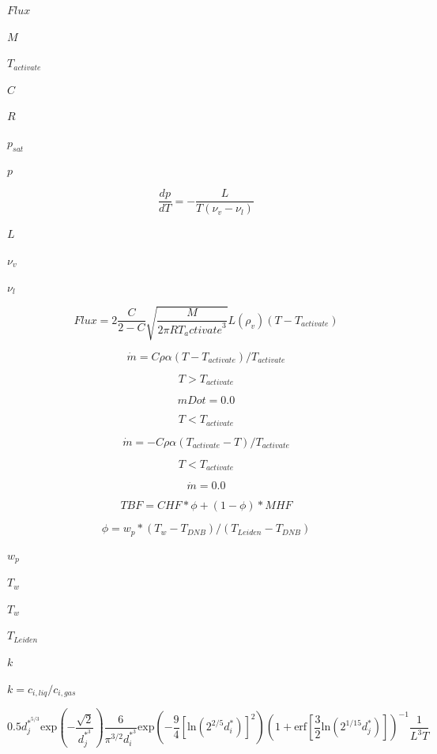 \documentclass{article}
\begin{document}
$            Flux    $
\pagebreak

$            M       $
\pagebreak

$            T_{activate} $
\pagebreak

$            C       $
\pagebreak

$            R       $
\pagebreak

$            p_{sat} $
\pagebreak

$            p       $
\pagebreak

\[
        \frac{dp}{dT} = - \frac{L}{T (\nu_v - \nu_l)}
    \]
\pagebreak

$            L       $
\pagebreak

$            \nu_v   $
\pagebreak

$            \nu_l   $
\pagebreak

\[
        Flux =
           2 \frac{C}{2 - C}
           \sqrt{\frac{M}{2 \pi R {T_activate}^3}} L (\rho_{v})
           (T - T_{activate})
    \]
\pagebreak

\[
    \dot{m} = C \rho \alpha (T - T_{activate})/T_{activate}
\]
\pagebreak

\[ T > T_{activate} \]
\pagebreak

\[ mDot = 0.0 \]
\pagebreak

\[  T < T_{activate} \]
\pagebreak

\[
    \dot{m} = -C \rho \alpha (T_{activate} - T)/T_{activate}
\]
\pagebreak

\[ T < T_{activate} \]
\pagebreak

\[ \dot{m} = 0.0 \]
\pagebreak

\[
    TBF = CHF*\phi + (1 - \phi)*MHF
\]
\pagebreak

\[
    \phi = w_p*(T_w - T_{DNB})/(T_{Leiden} - T_{DNB})
\]
\pagebreak

$        w_p $
\pagebreak

$        T_w $
\pagebreak

$T_w$
\pagebreak

$T_{Leiden}$
\pagebreak

$k$
\pagebreak

$k =
c_{i,liq}/c_{i,gas}$
\pagebreak

\[
    0.5 d_j^{*^{5/3}} \mathrm{exp}\left(-\frac{\sqrt{2}}{d_j^{*^{3}}}\right)
    \frac{6}{\pi^{3/2}d_i^{*^{3}}}
    \mathrm{exp}
    \left(
      - \frac{9}{4}\left[\mathrm{ln}\left(2^{2/5} d_i^{*}\right)\right]^{2}
    \right)
    \left(
        1
      + \mathrm{erf}
        \left[
            \frac{3}{2}\mathrm{ln} \left(2^{1/15} d_j^{*}\right)
        \right]
    \right)^{-1}
    \frac{1}{L^{3}T}
\]
\pagebreak
\end{document}
